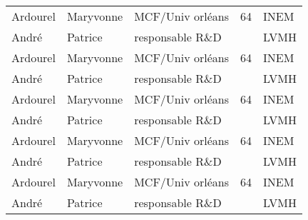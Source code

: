 \begin{tabular}{|m{2cm}|m{2cm}|m{2cm}|m{1cm}|m{8cm}|}
 \cellcolor{couleurClaire} \color{couleurTexte} Ardourel  & \cellcolor{couleurClaire} \color{couleurTexte} Maryvonne & \cellcolor{couleurClaire} \color{couleurTexte} MCF/Univ orléans & \cellcolor{couleurClaire} \color{couleurTexte} 64 & \cellcolor{couleurClaire} \color{couleurTexte} INEM \\ \cline{1-5}
 \color{black} André & \color{black} Patrice & \color{black} responsable R\&D & \color{black} & \color{black} LVMH \\ \cline{1-5}

 \cellcolor{couleurClaire} \color{couleurTexte} Ardourel  & \cellcolor{couleurClaire} \color{couleurTexte} Maryvonne & \cellcolor{couleurClaire} \color{couleurTexte} MCF/Univ orléans & \cellcolor{couleurClaire} \color{couleurTexte} 64 & \cellcolor{couleurClaire} \color{couleurTexte} INEM \\ \cline{1-5}
 \color{black} André & \color{black} Patrice & \color{black} responsable R\&D & \color{black} & \color{black} LVMH \\ \cline{1-5}

 \cellcolor{couleurClaire} \color{couleurTexte} Ardourel  & \cellcolor{couleurClaire} \color{couleurTexte} Maryvonne & \cellcolor{couleurClaire} \color{couleurTexte} MCF/Univ orléans & \cellcolor{couleurClaire} \color{couleurTexte} 64 & \cellcolor{couleurClaire} \color{couleurTexte} INEM \\ \cline{1-5}
 \color{black} André & \color{black} Patrice & \color{black} responsable R\&D & \color{black} & \color{black} LVMH \\ \cline{1-5}

 \cellcolor{couleurClaire} \color{couleurTexte} Ardourel  & \cellcolor{couleurClaire} \color{couleurTexte} Maryvonne & \cellcolor{couleurClaire} \color{couleurTexte} MCF/Univ orléans & \cellcolor{couleurClaire} \color{couleurTexte} 64 & \cellcolor{couleurClaire} \color{couleurTexte} INEM \\ \cline{1-5}
 \color{black} André & \color{black} Patrice & \color{black} responsable R\&D & \color{black} & \color{black} LVMH \\ \cline{1-5}

 \cellcolor{couleurClaire} \color{couleurTexte} Ardourel  & \cellcolor{couleurClaire} \color{couleurTexte} Maryvonne & \cellcolor{couleurClaire} \color{couleurTexte} MCF/Univ orléans & \cellcolor{couleurClaire} \color{couleurTexte} 64 & \cellcolor{couleurClaire} \color{couleurTexte} INEM \\ \cline{1-5}
 \color{black} André & \color{black} Patrice & \color{black} responsable R\&D & \color{black} & \color{black} LVMH \\ \cline{1-5}


\end{tabular}
